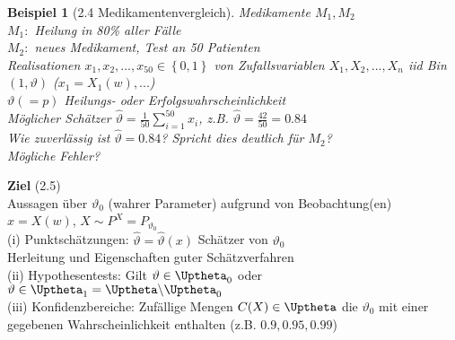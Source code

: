 \documentclass[a4paper,openany]{book}
\theoremstyle{mytheoremstyle}
\newtheorem*{bei}{Beispiel}
\theoremstyle{mytheoremstyle2}
\begin{document}
\begin{bei}[2.4 Medikamentenvergleich]
  Medikamente $M_1,M_2$\\
  $M_1:$ Heilung in 80\% aller Fälle \\ 
  $M_2:$ neues Medikament, Test an 50 Patienten \\
  Realisationen $x_1,x_2,...,x_{50}\in \left\{0,1\right\}$ von Zufallsvariablen $X_1,X_2,...,X_n$ iid Bin$(1,\vartheta)$ ($x_1=X_1(w),...$) \\
  $\vartheta(=p)$ Heilungs- oder Erfolgswahrscheinlichkeit \\
  Möglicher Schätzer $\hat{\vartheta}=\frac{1}{50}\sum_{i=1}^{50}{x_i}$, z.B. $\hat{\vartheta}=\frac{42}{50}=0.84$ \\
  Wie zuverlässig ist $\hat{\vartheta}=0.84$? Spricht dies deutlich für $M_2$? \\
  Mögliche Fehler?
\end{bei}
\noindent \textbf{Ziel} (2.5)\\
Aussagen über $\vartheta_0$ (wahrer Parameter) aufgrund von Beobachtung(en) $x=X(w)$, $X\sim P^X=P_{\vartheta_0}$  \\
(i) Punktschätzungen: $\hat{\vartheta}=\hat{\vartheta}(x)$ Schätzer von $\vartheta_0$  \\
Herleitung und Eigenschaften guter Schätzverfahren \\
(ii) Hypothesentests: Gilt $\vartheta \in \Uptheta_0$ oder $\vartheta \in \Uptheta_1=\Uptheta \backslash\Uptheta_0$  \\
(iii) Konfidenzbereiche: Zufällige Mengen $C(X)\in \Uptheta$ die $\vartheta_0$ mit einer gegebenen Wahrscheinlichkeit enthalten (z.B. $0.9,0.95,0.99$)  
\end{document}
